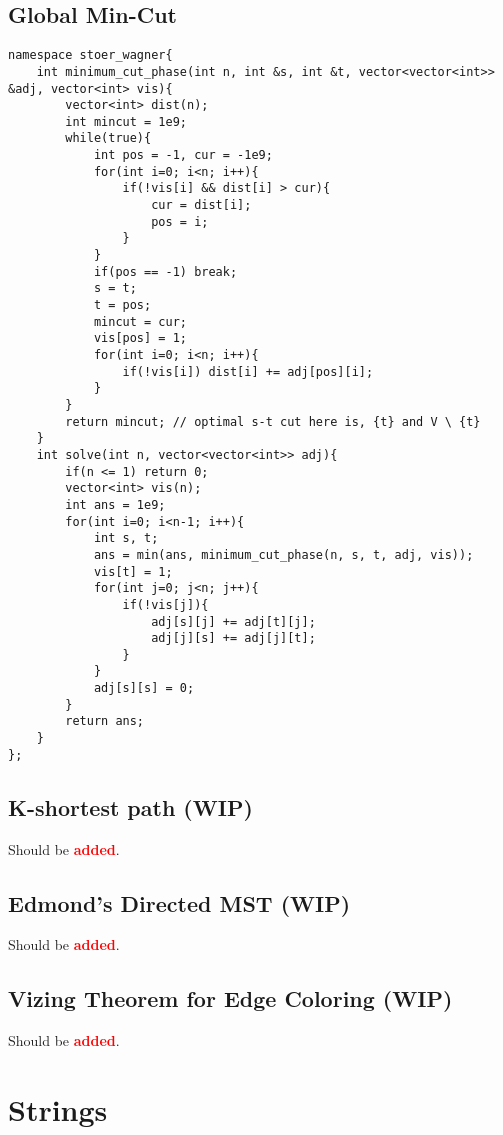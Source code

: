 \documentclass[landscape, 10pt, a4paper, oneside,  twocolumn]{article}
\newcommand{\added}{Should be \textcolor{red}{\textbf{added}}.}
\begin{document}
\subsection {Global Min-Cut}
\begin{verbatim}
namespace stoer_wagner{
	int minimum_cut_phase(int n, int &s, int &t, vector<vector<int>> &adj, vector<int> vis){
		vector<int> dist(n);
		int mincut = 1e9;
		while(true){
			int pos = -1, cur = -1e9;
			for(int i=0; i<n; i++){
				if(!vis[i] && dist[i] > cur){
					cur = dist[i];
					pos = i;
				}
			}
			if(pos == -1) break;
			s = t;
			t = pos;
			mincut = cur;
			vis[pos] = 1;
			for(int i=0; i<n; i++){
				if(!vis[i]) dist[i] += adj[pos][i];
			}
		}
		return mincut; // optimal s-t cut here is, {t} and V \ {t}
	}
	int solve(int n, vector<vector<int>> adj){
		if(n <= 1) return 0;
		vector<int> vis(n);
		int ans = 1e9;
		for(int i=0; i<n-1; i++){
			int s, t;
			ans = min(ans, minimum_cut_phase(n, s, t, adj, vis)); 
			vis[t] = 1;
			for(int j=0; j<n; j++){
				if(!vis[j]){
					adj[s][j] += adj[t][j];
					adj[j][s] += adj[j][t];
				}
			}
			adj[s][s] = 0;
		}
		return ans;
	}
};
\end{verbatim}

\subsection{K-shortest path (WIP)}
\added

\subsection {Edmond's Directed MST (WIP)}
\added

\subsection {Vizing Theorem for Edge Coloring (WIP)}
\added

\section{Strings}
\end{document}
